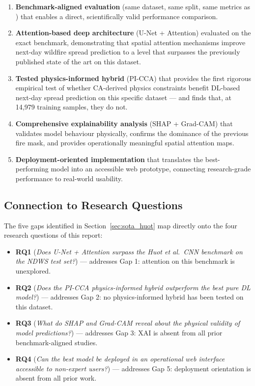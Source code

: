 \begin{enumerate}
    \item \textbf{Benchmark-aligned evaluation} (same dataset, same split, same metrics as \citet{huot2022next}) that enables a direct, scientifically valid performance comparison.

    \item \textbf{Attention-based deep architecture} (U-Net + Attention) evaluated on the exact benchmark, demonstrating that spatial attention mechanisms improve next-day wildfire spread prediction to a level that surpasses the previously published state of the art on this dataset.

    \item \textbf{Tested physics-informed hybrid} (PI-CCA) that provides the first rigorous empirical test of whether CA-derived physics constraints benefit DL-based next-day spread prediction on this specific dataset — and finds that, at 14,979 training samples, they do not.

    \item \textbf{Comprehensive explainability analysis} (SHAP + Grad-CAM) that validates model behaviour physically, confirms the dominance of the previous fire mask, and provides operationally meaningful spatial attention maps.

    \item \textbf{Deployment-oriented implementation} that translates the best-performing model into an accessible web prototype, connecting research-grade performance to real-world usability.
\end{enumerate}

\subsection{Connection to Research Questions}

The five gaps identified in Section~\ref{sec:sota_huot} map directly onto the four research questions of this report:

\begin{itemize}
    \item \textbf{RQ1} (\textit{Does U-Net + Attention surpass the Huot et al.\ CNN benchmark on the NDWS test set?}) — addresses Gap 1: attention on this benchmark is unexplored.

    \item \textbf{RQ2} (\textit{Does the PI-CCA physics-informed hybrid outperform the best pure DL model?}) — addresses Gap 2: no physics-informed hybrid has been tested on this dataset.

    \item \textbf{RQ3} (\textit{What do SHAP and Grad-CAM reveal about the physical validity of model predictions?}) — addresses Gap 3: XAI is absent from all prior benchmark-aligned studies.

    \item \textbf{RQ4} (\textit{Can the best model be deployed in an operational web interface accessible to non-expert users?}) — addresses Gap 5: deployment orientation is absent from all prior work.
\end{itemize}

